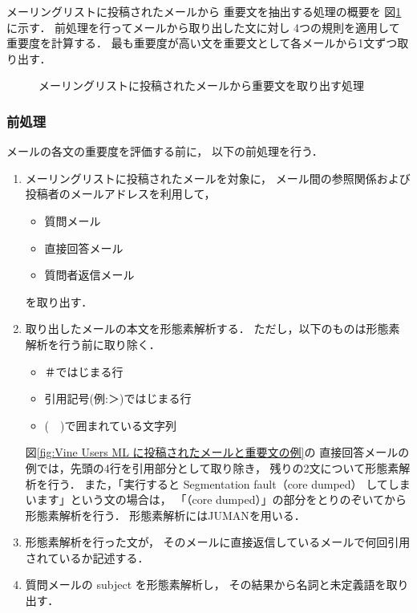  メーリングリストに投稿されたメールから
 重要文を抽出する処理の概要を
 図\ref{fig:メーリングリストに投稿されたメールから重要文を取り出す処理}に示す．
 前処理を行ってメールから取り出した文に対し
 4つの規則を適用して重要度を計算する．
 最も重要度が高い文を重要文として各メールから1文ずつ取り出す．

 \begin{figure}[t]
  \begin{center}
   
   \caption{メーリングリストに投稿されたメールから重要文を取り出す処理}
   \label{fig:メーリングリストに投稿されたメールから重要文を取り出す処理}
  \end{center}
 \end{figure}

 \subsubsection{前処理}
  
  メールの各文の重要度を評価する前に，
  以下の前処理を行う．
  \begin{enumerate}
   \renewcommand{\labelenumi}{}
   \item メーリングリストに投稿されたメールを対象に，
	 メール間の参照関係および投稿者のメールアドレスを利用して，
	 \begin{itemize}
	  \item 質問メール 
	  \item 直接回答メール
	  \item 質問者返信メール
	 \end{itemize}
	 を取り出す．
	 
   \item 取り出したメールの本文を形態素解析する．
	 ただし，以下のものは形態素解析を行う前に取り除く．
	 \begin{itemize}
	  \item ＃ではじまる行
	  \item 引用記号(例:＞)ではじまる行
	  \item (　)で囲まれている文字列
	 \end{itemize}
	 図\ref{fig:Vine Users ML に投稿されたメールと重要文の例}の
	 直接回答メールの例では，先頭の4行を引用部分として取り除き，
	 残りの2文について形態素解析を行う．
	 また，「実行すると Segmentation fault（core dumped）
	 してしまいます」という文の場合は，
	 「（core dumped）」の部分をとりのぞいてから形態素解析を行う．
	 形態素解析にはJUMAN\cite{man:juman98}を用いる．

   \item 形態素解析を行った文が，
	 そのメールに直接返信しているメールで何回引用されているか記述する．

   \item 質問メールの subject を形態素解析し，
	 その結果から名詞と未定義語を取り出す．

  \end{enumerate}
  
